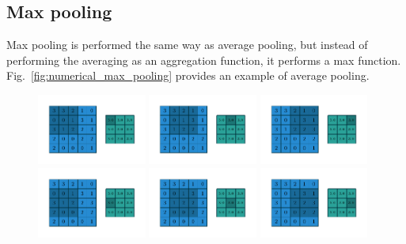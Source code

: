 \subsection{Max pooling}
Max pooling is performed the same way as average pooling, but instead of performing the averaging as an aggregation function, it performs a max function. Fig.~\ref{fig:numerical_max_pooling} provides an example of average pooling.
\begin{figure}
    \centering
    \includegraphics[width=0.32\textwidth]{pdf/numerical_max_pooling_00.pdf}
    \includegraphics[width=0.32\textwidth]{pdf/numerical_max_pooling_01.pdf}
    \includegraphics[width=0.32\textwidth]{pdf/numerical_max_pooling_02.pdf}
    \includegraphics[width=0.32\textwidth]{pdf/numerical_max_pooling_03.pdf}
    \includegraphics[width=0.32\textwidth]{pdf/numerical_max_pooling_04.pdf}
    \includegraphics[width=0.32\textwidth]{pdf/numerical_max_pooling_05.pdf}

\end{figure}
